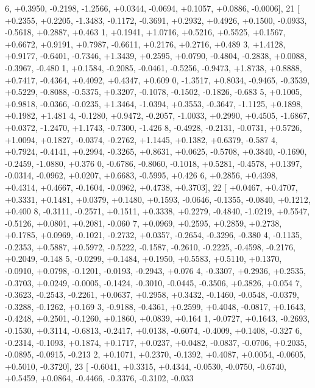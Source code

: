 \begin{DoxyCode}
      6, +0.3950, -0.2198, -1.2566, +0.0344, -0.0694, +0.1057, +0.0886, -0.0006],
21 [ +0.2355, +0.2205, -1.3483, -0.1172, -0.3691, +0.2932, +0.4926, +0.1500, -0.0933, -0.5618, +0.2887, +0.463
      1, +0.1941, +1.0716, +0.5216, +0.5525, +0.1567, +0.6672, +0.9191, +0.7987, -0.6611, +0.2176, +0.2716, +0.489
      3, +1.4128, +0.9177, -0.6401, -0.7346, +1.3439, +0.2595, +0.0790, -0.4804, -0.2838, +0.0088, -0.3967, -0.480
      1, +0.1584, -0.2085, -0.0461, -0.5256, -0.9473, +1.8738, +0.8888, +0.7417, -0.4364, +0.4092, +0.4347, +0.609
      0, -1.3517, +0.8034, -0.9465, -0.3539, +0.5229, -0.8088, -0.5375, +0.3207, -0.1078, -0.1502, -0.1826, -0.683
      5, +0.1005, +0.9818, -0.0366, -0.0235, +1.3464, -1.0394, +0.3553, -0.3647, -1.1125, +0.1898, +0.1982, +1.481
      4, -0.1280, +0.9472, -0.2057, -1.0033, +0.2990, +0.4505, -1.6867, +0.0372, -1.2470, +1.1743, -0.7300, -1.426
      8, -0.4928, -0.2131, -0.0731, +0.5726, +1.0094, +0.1827, -0.0374, -0.2762, +1.1445, +0.1382, +0.6379, -0.587
      4, +0.7924, -0.4141, +0.2994, -0.3265, +0.8631, +0.0625, -0.5708, +0.3840, -0.1690, -0.2459, -1.0880, +0.376
      0, -0.6786, -0.8060, -0.1018, +0.5281, -0.4578, +0.1397, -0.0314, -0.0962, +0.0207, +0.6683, -0.5995, +0.426
      6, +0.2856, +0.4398, +0.4314, +0.4667, -0.1604, -0.0962, +0.4738, +0.3703],
22 [ +0.0467, +0.4707, +0.3331, +0.1481, +0.0379, +0.1480, +0.1593, -0.0646, -0.1355, -0.0840, +0.1212, +0.400
      8, -0.3111, -0.2571, +0.1511, +0.3338, +0.2279, -0.4840, -1.0219, +0.5547, -0.5126, +0.0801, +0.2081, -0.060
      7, +0.0969, +0.2595, +0.2859, +0.2738, +0.1785, +0.0969, -0.1021, -0.2732, +0.0357, -0.2654, -0.3296, -0.380
      4, -0.1135, -0.2353, +0.5887, +0.5972, -0.5222, -0.1587, -0.2610, -0.2225, -0.4598, -0.2176, +0.2049, -0.148
      5, -0.0299, +0.1484, +0.1950, +0.5583, +0.5110, +0.1370, -0.0910, +0.0798, -0.1201, -0.0193, -0.2943, +0.076
      4, -0.3307, +0.2936, +0.2535, -0.3703, +0.0249, -0.0005, -0.1424, -0.3010, -0.0445, -0.3506, +0.3826, +0.054
      7, -0.3623, -0.2543, -0.2261, +0.0637, +0.2958, +0.3432, -0.1460, -0.0548, -0.0379, -0.3288, -0.1262, +0.169
      3, -0.9188, -0.4361, +0.2599, +0.4048, -0.0817, +0.1643, -0.4248, +0.2501, -0.1260, +0.1860, +0.0839, +0.164
      1, -0.0727, +0.1643, -0.2693, -0.1530, +0.3114, -0.6813, -0.2417, +0.0138, -0.6074, -0.4009, +0.1408, -0.327
      6, -0.2314, -0.1093, +0.1874, +0.1717, +0.0237, +0.0482, -0.0837, -0.0706, +0.2035, -0.0895, -0.0915, -0.213
      2, +0.1071, +0.2370, -0.1392, +0.4087, +0.0054, -0.0605, +0.5010, -0.3720],
23 [ -0.6041, +0.3315, +0.4344, -0.0530, -0.0750, -0.6740, +0.5459, +0.0864, -0.4466, -0.3376, -0.3102, -0.033

\end{DoxyCode}
